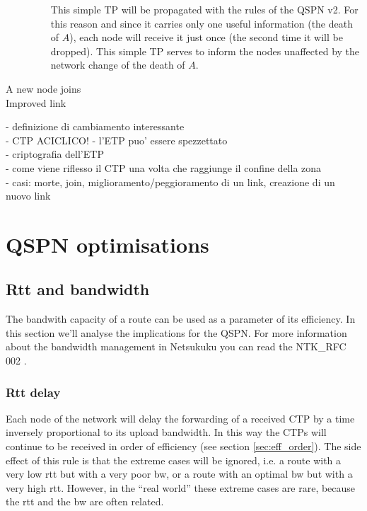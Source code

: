 \documentclass[a4paper]{article}
\begin{document}
\begin{description}
\begin{enumerate}
				This simple TP will be propagated with the
				rules of the QSPN v2. For this reason and since it carries
				only one useful information (the death of
				$A$), each node will receive it just once (the
				second time it will be dropped). This simple
				TP serves to inform the nodes unaffected
				by the network change of the death of $A$.
		\end{enumerate}
	\item[A new node joins]
	\item[Improved link]
\end{description}
- definizione di cambiamento interessante\\
- CTP ACICLICO!
- l'ETP puo' essere spezzettato\\
- criptografia dell'ETP\\
- come viene riflesso il CTP una volta che raggiunge il confine della zona\\
- casi: morte, join, miglioramento/peggioramento di un link, creazione di un nuovo link
%
%
%

\section{QSPN optimisations}
\subsection{Rtt and bandwidth}
\label{sec:bandwidth_q1q2}

The bandwith capacity of a route can be used as a parameter of its
efficiency. In this section we'll analyse the implications for the QSPN.
For more information about the bandwidth management in Netsukuku you can read
the NTK\_RFC 002 \cite{ntkrfc0002}.

\subsubsection{Rtt delay}
\label{sec:rtt_delay}

Each node of the network will delay the forwarding of a received CTP by a time
inversely proportional to its upload bandwidth. In this way the CTPs will
continue to be received in order of efficiency (see section
\ref{sec:eff_order}).
The side effect of this rule is that the extreme cases will be ignored, i.e. a
route with a very low rtt but with a very poor bw, or a route with an optimal
bw but with a very high rtt. However, in the ``real world'' these extreme
cases are rare, because the rtt and the bw are often related.
\end{document}
